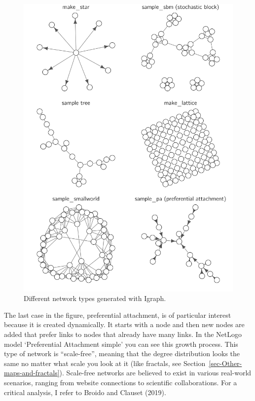 \documentclass[
  a4paper,
  DIV=11,
  numbers=noendperiod]{scrreprt}
\begin{document}
\begin{figure}

{\centering \includegraphics{media/ch6/fig-ch6-img3-old-72.png}

}

\caption{\label{fig-ch6-img3-old-72}Different network types generated
with Igraph.}

\end{figure}

The last case in the figure, preferential attachment, is of particular
interest because it is created dynamically. It starts with a node and
then new nodes are added that prefer links to nodes that already have
many links. In the NetLogo model `Preferential Attachment simple' you
can see this growth process. This type of network is ``scale-free'',
meaning that the degree distribution looks the same no matter what scale
you look at it (like fractals, see
Section~\ref{sec-Other-maps-and-fractals}). Scale-free networks are
believed to exist in various real-world scenarios, ranging from website
connections to scientific collaborations. For a critical analysis, I
refer to Broido and Clauset (2019).
\end{document}
